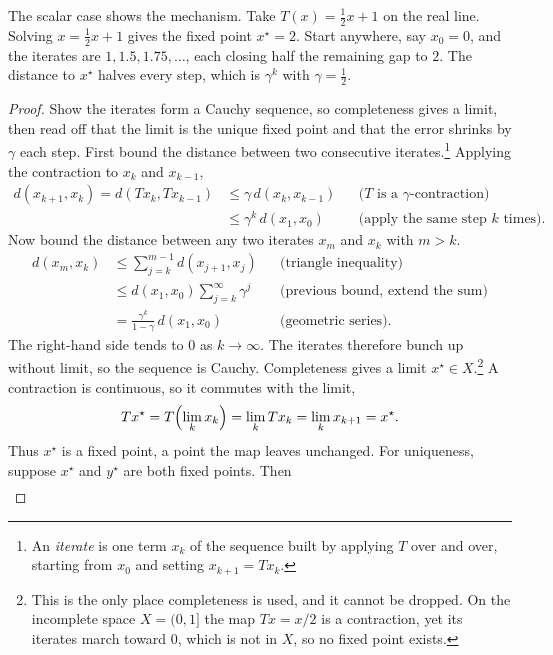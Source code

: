 The scalar case shows the mechanism. Take $T(x) = \tfrac{1}{2}x + 1$ on the real line. Solving $x = \tfrac{1}{2}x + 1$ gives the fixed point $x^\star = 2$. Start anywhere, say $x_0 = 0$, and the iterates are $1, 1.5, 1.75, \ldots$, each closing half the remaining gap to $2$. The distance to $x^\star$ halves every step, which is $\gamma^k$ with $\gamma = \tfrac{1}{2}$.

\begin{proof}
Show the iterates form a Cauchy sequence, so completeness gives a limit, then read off that the limit is the unique fixed point and that the error shrinks by $\gamma$ each step. First bound the distance between two consecutive iterates.\footnote{An \emph{iterate} is one term $x_k$ of the sequence built by applying $T$ over and over, starting from $x_0$ and setting $x_{k+1} = Tx_k$.} Applying the contraction to $x_k$ and $x_{k-1}$,
\begin{align*}
d(x_{k+1}, x_k) = d(Tx_k, Tx_{k-1})
  &\leq \gamma\, d(x_k, x_{k-1}) && \text{($T$ is a $\gamma$-contraction)} \\
  &\leq \gamma^k\, d(x_1, x_0) && \text{(apply the same step $k$ times).}
\end{align*}
Now bound the distance between any two iterates $x_m$ and $x_k$ with $m > k$.
\begin{align*}
d(x_m, x_k)
  &\leq \sum_{j=k}^{m-1} d(x_{j+1}, x_j) && \text{(triangle inequality)} \\
  &\leq d(x_1, x_0) \sum_{j=k}^{\infty} \gamma^j && \text{(previous bound, extend the sum)} \\
  &= \frac{\gamma^k}{1-\gamma}\, d(x_1, x_0) && \text{(geometric series).}
\end{align*}
The right-hand side tends to $0$ as $k \to \infty$. The iterates therefore bunch up without limit, so the sequence is Cauchy. Completeness gives a limit $x^\star \in X$.\footnote{This is the only place completeness is used, and it cannot be dropped. On the incomplete space $X = (0,1]$ the map $Tx = x/2$ is a contraction, yet its iterates march toward $0$, which is not in $X$, so no fixed point exists.} A contraction is continuous, so it commutes with the limit,
\begin{align*}
Tx^\star = T\Bigl(\lim_k x_k\Bigr) = \lim_k Tx_k = \lim_k x_{k+1} = x^\star .
\end{align*}
Thus $x^\star$ is a fixed point, a point the map leaves unchanged. For uniqueness, suppose $x^\star$ and $y^\star$ are both fixed points. Then
\begin{align*}

\end{align*}
\end{proof}
